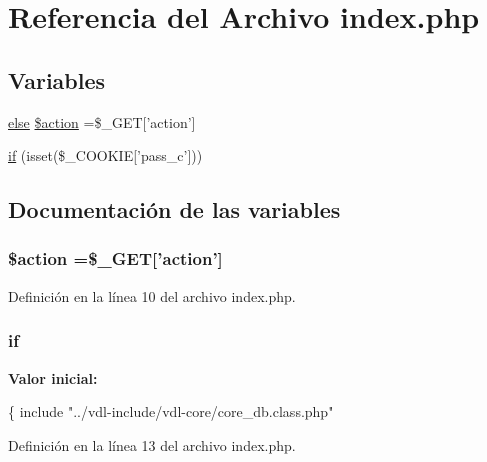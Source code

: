 \hypertarget{index_8php}{\section{Referencia del Archivo index.\-php}
\label{index_8php}
}
\subsection*{Variables}
\begin{DoxyCompactItemize}
\item 
\hyperlink{groups_8php_a88f0c6b924aa990ea8ecc6fbad90bd6a}{else} \hyperlink{index_8php_a3548dead60c5d9eac23b44bee5e21edf}{\$action} =\$\-\_\-\-G\-E\-T\mbox{[}'action'\mbox{]}
\item 
\hyperlink{index_8php_a03ed0eadab502a2cb754ef4963570e97}{if} (isset(\$\-\_\-\-C\-O\-O\-K\-I\-E\mbox{[}'pass\-\_\-c'\mbox{]}))
\end{DoxyCompactItemize}


\subsection{Documentación de las variables}
\hypertarget{index_8php_a3548dead60c5d9eac23b44bee5e21edf}{
\subsubsection[{\$action}]{ \$action =\$\-\_\-\-G\-E\-T\mbox{[}'action'\mbox{]}}}\label{index_8php_a3548dead60c5d9eac23b44bee5e21edf}


Definición en la línea 10 del archivo index.\-php.

\hypertarget{index_8php_a03ed0eadab502a2cb754ef4963570e97}{
\subsubsection[{if}]{\setlength{\rightskip}{0pt plus 5cm}if}}\label{index_8php_a03ed0eadab502a2cb754ef4963570e97}
{\bfseries Valor inicial\-:}
\begin{DoxyCode}
\{
                        include \textcolor{stringliteral}{"../vdl-include/vdl-core/core\_db.class.php"}
\end{DoxyCode}


Definición en la línea 13 del archivo index.\-php.

